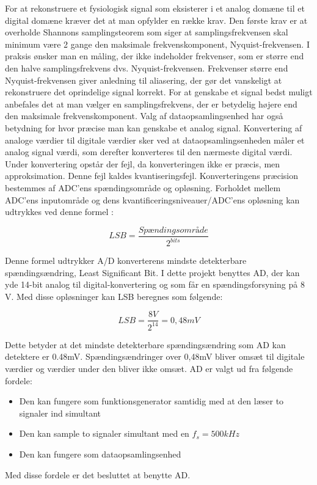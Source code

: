 For at rekonstruere et fysiologisk signal som eksisterer i et analog domæne til et digital domæne kræver det at man opfylder en række krav. Den første krav er at overholde Shannons samplingsteorem som siger at samplingsfrekvensen skal minimum være 2 gange den maksimale frekvenskomponent, Nyquist-frekvensen. I praksis ønsker man en måling, der ikke indeholder frekvenser, som er større end den halve samplingsfrekvens dvs. Nyquist-frekvensen. Frekvenser større end Nyquist-frekvensen giver anledning til aliasering, der gør det vanskeligt at rekonstruere det oprindelige signal korrekt. For at genskabe et signal bedst muligt anbefales det at man vælger en samplingsfrekvens, der er betydelig højere end den maksimale frekvenskomponent. Valg af dataopsamlingsenhed har også betydning for hvor præcise man kan genskabe et analog signal. Konvertering af analoge værdier til digitale værdier sker ved at dataopsamlingsenheden måler et analog signal værdi, som derefter konverteres til den nærmeste digital værdi. Under konvertering opstår der fejl, da konverteringen ikke er præcis, men approksimation. Denne fejl kaldes kvantiseringsfejl.  Konverteringens præcision bestemmes af ADC'ens spændingsområde og opløsning. Forholdet mellem ADC'ens inputområde og dens kvantificeringsniveauer/ADC’ens opløsning kan udtrykkes ved denne formel  \cite [s. 634-635]{Lyons}:

\begin{equation}
\label{eq2.1}
 LSB=  \dfrac{{Spændingsområde}}{2^{bits}} 
\end{equation}

Denne formel udtrykker A/D konverterens mindste detekterbare spændingsændring, Least Significant Bit. I dette projekt benyttes AD, der kan yde 14-bit analog til digital-konvertering og som får en spændingsforsyning på 8 V. Med disse opløsninger kan LSB beregnes som følgende:

 \begin{equation}
\label{eq2.2}
 LSB=  \dfrac{{8V}}{2^{14}}=0,48 mV 
\end{equation}
 
 Dette betyder at det mindste detekterbare spændingsændring som AD kan detektere er 0.48mV. Spændingsændringer over 0,48mV bliver omsæt til digitale værdier og værdier under den bliver ikke omsæt. AD er valgt ud fra følgende fordele:
 
 \begin{itemize}
\item 	Den kan fungere som funktionsgenerator samtidig med at den læser to signaler ind simultant
\item Den kan sample to signaler simultant med en $f_{s}=500kHz $
\item Den kan fungere som dataopsamlingsenhed 
 
\end{itemize}
Med disse fordele er det besluttet at benytte AD. 
 
